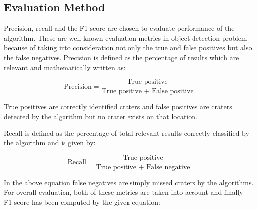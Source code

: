 \documentclass[11pt]{article}
\begin{document}


\subsection{Evaluation Method}
Precision, recall and the F1-score are chosen to evaluate performance of the algorithm. These are well known evaluation metrics in object detection problem because of taking into consideration not only the true and false positives but also the false negatives. Precision is defined as the percentage of results which are relevant and mathematically written as:

\begin{equation}
\text{Precision} = \frac{\text{True positive}}{\text{True positive + False positive}}
\label{precision}
\end{equation}

True positives are correctly identified craters and false positives are craters detected by the algorithm but no crater exists on that location.

Recall is defined as the percentage of total relevant results correctly classified by the algorithm and is given by:

\begin{equation}
\text{Recall} = \frac{\text{True positive}}{\text{True positive + False negative}}
\label{recall}
\end{equation}

In the above equation false negatives are simply missed craters by the algorithms. For overall evaluation, both of these metrics are taken into account and finally F1-score has been computed by the given equation:
\end{document}
